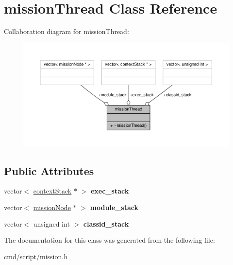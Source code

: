 \hypertarget{classmissionThread}{}\section{mission\+Thread Class Reference}
\label{classmissionThread}


Collaboration diagram for mission\+Thread\+:
\nopagebreak
\begin{figure}[H]
\begin{center}
\leavevmode
\includegraphics[width=350pt]{de/dc8/classmissionThread__coll__graph}
\end{center}
\end{figure}
\subsection*{Public Attributes}
\begin{DoxyCompactItemize}
\item 
vector$<$ \hyperlink{classcontextStack}{context\+Stack} $\ast$ $>$ {\bfseries exec\+\_\+stack}\hypertarget{classmissionThread_ac5c98a0e42dae775dc5ccdc1f761e85d}{}\label{classmissionThread_ac5c98a0e42dae775dc5ccdc1f761e85d}

\item 
vector$<$ \hyperlink{classmissionNode}{mission\+Node} $\ast$ $>$ {\bfseries module\+\_\+stack}\hypertarget{classmissionThread_ac02b4b5fbde602512b37a05cde44a248}{}\label{classmissionThread_ac02b4b5fbde602512b37a05cde44a248}

\item 
vector$<$ unsigned int $>$ {\bfseries classid\+\_\+stack}\hypertarget{classmissionThread_ade7721c272d3f7e841cadceff7242187}{}\label{classmissionThread_ade7721c272d3f7e841cadceff7242187}

\end{DoxyCompactItemize}


The documentation for this class was generated from the following file\+:\begin{DoxyCompactItemize}
\item 
cmd/script/mission.\+h\end{DoxyCompactItemize}
